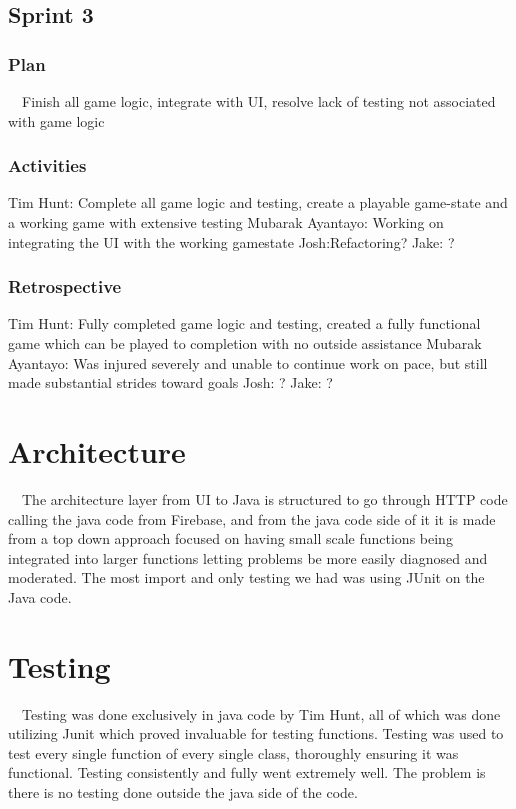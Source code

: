 \documentclass[12pt]{article}
\begin{document}
\subsection{Sprint 3}
\subsubsection{Plan}
\ \ Finish all game logic, integrate with UI, resolve lack of testing not associated with game logic
\subsubsection{Activities}
Tim Hunt: Complete all game logic and testing, create a playable game-state and a working game with extensive testing \newline
 Mubarak Ayantayo: Working on integrating the UI with the working gamestate \newline
Josh:Refactoring? \newline
Jake: ?
\subsubsection{Retrospective}
Tim Hunt: Fully completed game  logic and testing, created a fully functional game which can be played to completion with no outside assistance \newline
Mubarak Ayantayo: Was injured severely and unable to continue work on pace, but still made substantial strides toward goals \newline
Josh: ? \newline
Jake: ?
\section{Architecture}
\ \ The architecture layer from UI to Java is structured to go through HTTP code calling the java code from Firebase, and from the java code side of it it is made from a top down approach focused on having small scale functions being integrated into larger functions letting problems be more easily diagnosed and moderated. The most import and only testing we had was using JUnit on the Java code.
\section{Testing}
\ \ Testing was done exclusively in java code by Tim Hunt, all of which was done utilizing Junit which proved invaluable for testing functions. Testing was used to test every single function of every single class, thoroughly ensuring it was functional. Testing consistently and fully went extremely well. The problem is there is no testing done outside the java side of the code.
\end{document}
